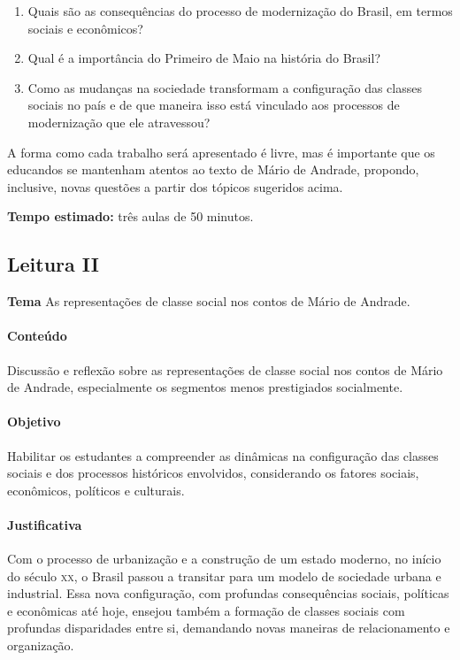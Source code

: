 \documentclass[12pt]{extarticle}
\begin{document}
{\begin{enumerate}
\item
  Quais são as consequências do processo de modernização do Brasil, em
  termos sociais e econômicos?
\item
  Qual é a importância do Primeiro de Maio na história do Brasil?
\item
  Como as mudanças na sociedade transformam a configuração das classes
  sociais no país e de que maneira isso está vinculado aos processos de
  modernização que ele atravessou?
\end{enumerate}

A forma como cada trabalho será apresentado é livre, mas é importante
que os educandos se mantenham atentos ao texto de Mário de Andrade,
propondo, inclusive, novas questões a partir dos tópicos sugeridos
acima.

\textbf{Tempo estimado:} três aulas de 50 minutos.

\subsection{Leitura II}

\textbf{Tema} As representações de classe social nos contos de Mário de Andrade.

\paragraph{Conteúdo} Discussão e reflexão sobre as representações de
classe social nos contos de Mário de Andrade, especialmente os segmentos
menos prestigiados socialmente.

\paragraph{Objetivo} Habilitar os estudantes a compreender as dinâmicas na
configuração das classes sociais e dos processos históricos envolvidos,
considerando os fatores sociais, econômicos, políticos e culturais.

\paragraph{Justificativa} Com o processo de urbanização e a construção de
um estado moderno, no início do século \textsc{xx}, o Brasil passou a transitar
para um modelo de sociedade urbana e industrial. Essa nova configuração,
com profundas consequências sociais, políticas e econômicas até hoje,
ensejou também a formação de classes sociais com profundas disparidades
entre si, demandando novas maneiras de relacionamento e organização.

}
\end{document}
